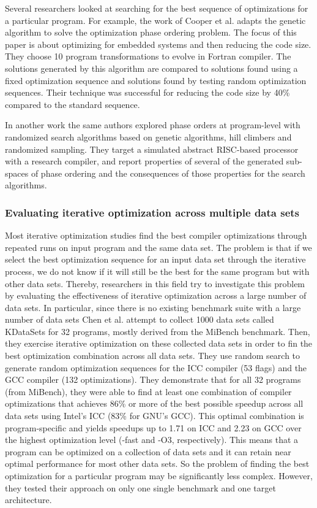 Several researchers looked at searching for the best sequence of optimizations for a particular program. For example, the work of Cooper et al.\cite{cooper1999optimizing} adapts the genetic algorithm to solve the optimization phase ordering problem. The focus of this paper is about optimizing for embedded systems and then reducing the code size. They choose 10 program transformations to evolve in Fortran compiler. The solutions generated by this algorithm are compared to solutions found using a fixed optimization sequence and solutions found by testing random optimization sequences. Their technique was successful for reducing the code size by 40\% compared to the standard sequence.

In another work\cite{cooper2006exploring} the same authors explored phase orders at program-level with randomized search algorithms based on genetic algorithms, hill climbers and randomized sampling. They target a simulated abstract RISC-based processor with a research compiler, and report properties of several of the generated sub-spaces of phase ordering and the consequences of those properties for the search algorithms.

\subsubsection{Evaluating iterative optimization across multiple data sets}
Most iterative optimization studies find the best compiler optimizations through repeated runs on input program and the same data set. The problem is that if we select the best optimization sequence for an input data set through the iterative process, we do not know if it will still be the best for the same program but with other data sets. Thereby, researchers in this field try to investigate this problem by evaluating the effectiveness of iterative optimization across a large number of data sets. In particular, since there is no existing benchmark suite with a large number of data sets  Chen et al.\cite{chen2010evaluating} attempt to collect 1000 data sets called KDataSets for 32 programs, mostly derived from the MiBench benchmark. Then, they exercise iterative optimization on these collected data sets in order to fin the best optimization combination across all data sets. 
They use random search to generate random optimization sequences for the ICC compiler (53 flags) and the GCC compiler (132 optimizations).
They demonstrate that for all 32 programs (from MiBench), they were able to find at least one combination of compiler optimizations that achieves 86\% or more of the best possible speedup across all data sets using Intel’s ICC (83\% for GNU’s GCC). This optimal combination is program-specific and yields speedups up to 1.71 on ICC and 2.23 on GCC over the highest optimization level (-fast and -O3, respectively). This means that a program can be optimized on a collection of data sets and it can retain near optimal performance for most other data sets. So the problem of finding the best optimization for a particular program may be significantly less complex. However, they tested their approach on only one single benchmark and one target architecture.




